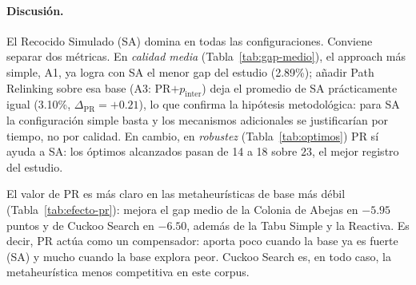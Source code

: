 \paragraph{Discusi\'on.} El Recocido Simulado (SA) domina en todas las configuraciones. Conviene separar dos m\'etricas. En \emph{calidad media} (Tabla~\ref{tab:gap-medio}), el approach m\'as simple, A1, ya logra con SA el menor gap del estudio (2.89\%); a\~nadir Path Relinking sobre esa base (A3: PR$+p_{\text{inter}}$) deja el promedio de SA pr\'acticamente igual (3.10\%, $\Delta_{\text{PR}}=+0.21$), lo que confirma la hip\'otesis metodol\'ogica: para SA la configuraci\'on simple basta y los mecanismos adicionales se justificar\'ian por tiempo, no por calidad. En cambio, en \emph{robustez} (Tabla~\ref{tab:optimos}) PR s\'i ayuda a SA: los \'optimos alcanzados pasan de 14 a 18 sobre $23$, el mejor registro del estudio.

El valor de PR es m\'as claro en las metaheur\'isticas de base m\'as d\'ebil (Tabla~\ref{tab:efecto-pr}): mejora el gap medio de la Colonia de Abejas en $-5.95$ puntos y de Cuckoo Search en $-6.50$, adem\'as de la Tabu Simple y la Reactiva. Es decir, PR act\'ua como un compensador: aporta poco cuando la base ya es fuerte (SA) y mucho cuando la base explora peor. Cuckoo Search es, en todo caso, la metaheur\'istica menos competitiva en este corpus.
